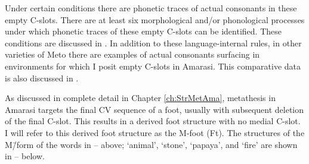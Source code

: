 Under certain conditions there are phonetic traces of actual consonants in these empty C-slots.
There are at least six morphological and/or phonological processes under
which phonetic traces of these empty C-slots can be identified.
These conditions are discussed in .
In addition to these language-internal rules,
in other varieties of Meto there are
examples of actual consonants surfacing in environments
for which I posit empty C-slots in Amarasi.
This comparative data is also discussed in .

As discussed in complete detail in Chapter \ref{ch:StrMetAma},
metathesis in Amarasi targets the final
CV sequence of a foot, usually with subsequent
deletion of the final C-slot.
This results in a derived foot structure with no medial C-slot.
I will refer to this derived foot structure as the M-foot (Ft).
The structures of the M\=/form of the words in -- above;
 {\ra}  `animal',  {\ra}  `stone',
 {\ra}  `papaya', and  {\ra}  `fire'
are shown in -- below.

